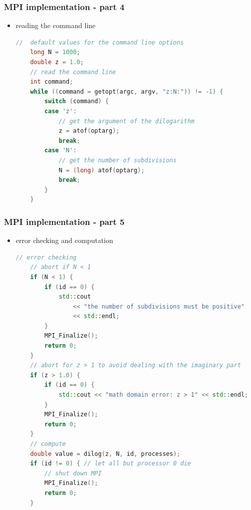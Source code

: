 \begin{frame}[fragile]
%
  \frametitle{MPI implementation - part 4}
%
  \begin{itemize}
  \item reading the command line
  \begin{lstlisting}[language=c++,name=mpi]
    //  default values for the command line options
    long N = 1000;
    double z = 1.0;
    // read the command line
    int command;
    while ((command = getopt(argc, argv, "z:N:")) != -1) {
        switch (command) {
        case 'z':
            // get the argument of the dilogarithm 
            z = atof(optarg);
            break;
        case 'N':
            // get the number of subdivisions
            N = (long) atof(optarg);
            break;
        }
    }
  \end{lstlisting}
%
  \end{itemize}
%
\end{frame}

\begin{frame}[fragile]
%
  \frametitle{MPI implementation - part 5}
%
  \begin{itemize}
  \item error checking and computation
  \begin{lstlisting}[language=c++,name=mpi]
    // error checking
    // abort if N < 1
    if (N < 1) {
        if (id == 0) {
            std::cout 
                << "the number of subdivisions must be positive"
                << std::endl;
        }
        MPI_Finalize();
        return 0;
    }
    // abort for z > 1 to avoid dealing with the imaginary part
    if (z > 1.0) {
        if (id == 0) {
            std::cout << "math domain error: z > 1" << std::endl;
        }
        MPI_Finalize();
        return 0;
    } 
    // compute
    double value = dilog(z, N, id, processes);
    if (id != 0) { // let all but processor 0 die
        // shut down MPI
        MPI_Finalize();
        return 0;
    }
  \end{lstlisting}
%
  \end{itemize}
%
\end{frame}

